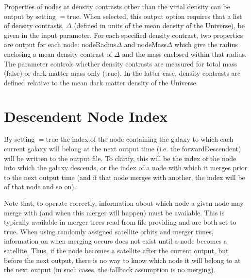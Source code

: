 Properties of nodes at density contrasts other than the virial density can be output by setting {\normalfont \ttfamily [outputDensityContrastData]}$=${\normalfont \ttfamily true}. When selected, this output option requires that a list of density contrasts, $\Delta$ (defined in units of the mean density of the Universe), be given in the {\normalfont \ttfamily [outputDensityContrastValues]} input parameter. For each specified density contrast, two properties are output for each node: {\normalfont \ttfamily nodeRadius}$\Delta$ and {\normalfont \ttfamily nodeMass}$\Delta$ which give the radius enclosing a mean density contrast of $\Delta$ and the mass enclosed within that radius. The parameter {\normalfont \ttfamily [outputDensityContrastDataDarkOnly]} controls whether density contrasts are measured for total mass ({\normalfont \ttfamily false}) or dark matter mass only ({\normalfont \ttfamily true}). In the latter case, density contrasts are defined relative to the mean dark matter density of the Universe.

\section{Descendent Node Index}

By setting {\normalfont \ttfamily [outputDescendentIndices]}$=${\normalfont \ttfamily true} the index of the node containing the galaxy to which each current galaxy will belong at the next output time (i.e. the \gls{forwardDescendent}) will be written to the output file. To clarify, this will be the index of the node into which the galaxy descends, or the index of a node with which it merges prior to the next output time (and if that node merges with another, the index will be of that node and so on).

Note that, to operate correctly, information about which node a given node may merge with (and when this merger will happen) must be available. This is typically available in merger trees read from file providing {\normalfont \ttfamily [treeNodeMethodSatelliteOrbit]} and {\normalfont \ttfamily [mergerTreeReadPresetMergerTimes]} are both set to {\normalfont \ttfamily true}. When using randomly assigned satellite orbits and merger times, information on when merging occurs does not exist until a node becomes a satellite. Thus, if the node becomes a satellite after the current output, but before the next output, there is no way to know which node it will belong to at the next output (in such cases, the fallback assumption is no merging).

